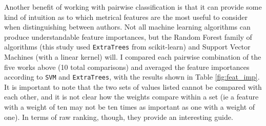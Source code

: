 \documentclass[11pt,a4paper]{scrartcl} %
\begin{document}
{Another benefit of working with pairwise classification is that it can provide some kind of intuition as to which metrical features are the most useful to consider when distinguishing between authors. Not all machine learning algorithms can produce understandable feature importances, but the Random Forest family of algorithms (this study used \texttt{ExtraTrees} from scikit-learn) and Support Vector Machines (with a linear kernel) will. I compared each pairwise combination of the five works above (10 total comparisons) and averaged the feature importances according to \texttt{SVM} and \texttt{ExtraTrees}, with the results shown in Table \ref{fig:feat_imp}. It is important to note that the two sets of values listed cannot be compared with each other, and it is not clear how the weights compare within a set (ie a feature with a weight of ten may not be ten times as important as one with a weight of one). In terms of raw ranking, though, they provide an interesting guide. 
\begin{table}
\caption{Ranked Feature Importances, as determined by \texttt{ExtraTrees} and \texttt{SVM}}
\label{fig:feat_imp}
\phantom{x}
\centering
{}
\end{table}
}
\end{document}
